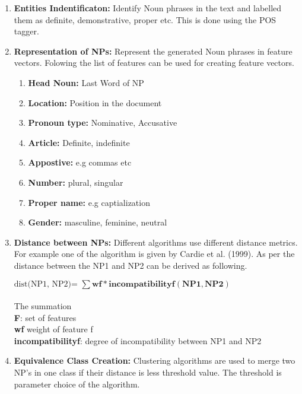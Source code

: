 \documentclass[11pt]{article}
\begin{document}
\begin {enumerate}

\item \textbf{Entities Indentificaton:} Identify Noun phrases in the text and labelled them as definite, demonstrative, proper etc. This is done using the POS tagger. 

\item \textbf{Representation of NPs:} Represent the generated Noun phrases in feature vectors. Folowing the list of features can be used for creating feature vectors.

\begin {enumerate}
\item \textbf{Head Noun:}  Last Word of NP
\item \textbf{Location:} Position in the document  
\item \textbf{Pronoun type:}  Nominative, Accusative
\item \textbf{Article:}  Definite, indefinite
\item \textbf{Appostive:}  e.g commas etc 
\item \textbf{Number:}  plural, singular
\item \textbf{Proper name:}  e.g captialization
\item \textbf{Gender:}  masculine, feminine, neutral
\end {enumerate}

\item \textbf{Distance between NPs:} Different algorithms use different distance metrics. For example one of the algorithm is given by Cardie et al. (1999). As per the distance between the NP1 and NP2 can be derived as following.

$\text{dist(NP1, NP2)= } \sum \mathbf{wf * incompatibilityf(NP1,NP2)} $ \\ \\
The summation \\
\textbf{F}: set of features \\
\textbf{wf} weight of feature f \\
\textbf{incompatibilityf}: degree of incompatibility between NP1 and NP2 





\item \textbf{Equivalence Class Creation:}  Clustering algorithms are used to merge two NP's in one class if their distance is less threshold value. The threshold is parameter choice of the algorithm.

\end {enumerate}
\end{document}
